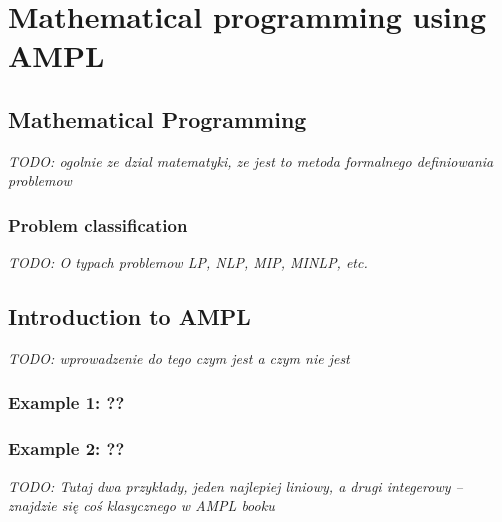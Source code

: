 \chapter{Mathematical programming using AMPL}
\label{chap:ampl} 


\section{Mathematical Programming}

\emph{TODO: ogolnie ze dzial matematyki, ze jest to metoda formalnego definiowania problemow}

\subsection{Problem classification}

\emph{TODO: O typach problemow LP, NLP, MIP, MINLP, etc.}

\section{Introduction to AMPL}

\emph{TODO: wprowadzenie do tego czym jest a czym nie jest}

\subsection{Example 1: ??}
\subsection{Example 2: ??}

\emph{TODO: Tutaj dwa przykłady, jeden najlepiej liniowy, a drugi integerowy – znajdzie się coś klasycznego w AMPL booku}